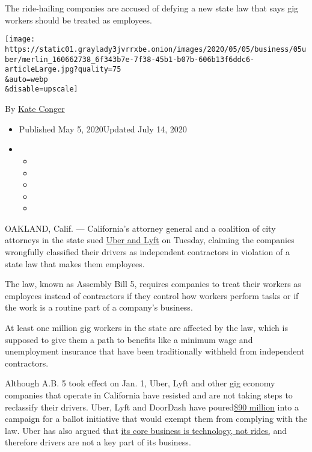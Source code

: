 The ride-hailing companies are accused of defying a new state law that
says gig workers should be treated as employees.

\texttt{[image: https://static01.graylady3jvrrxbe.onion/images/2020/05/05/business/05uber/merlin\_160662738\_6f343b7e-7f38-45b1-b07b-606b13f6ddc6-articleLarge.jpg?quality=75\\\&auto=webp\\\&disable=upscale]}

By \href{https://www.nytimes3xbfgragh.onion/by/kate-conger}{Kate Conger}

\begin{itemize}
\item
  Published May 5, 2020Updated July 14, 2020
\item
  \begin{itemize}
  \item
  \item
  \item
  \item
  \item
  \end{itemize}
\end{itemize}

OAKLAND, Calif. --- California's attorney general and a coalition of
city attorneys in the state sued
\href{https://www.nytimes3xbfgragh.onion/2020/08/20/technology/uber-lyft-california-shutdown.html}{Uber
and Lyft} on Tuesday, claiming the companies wrongfully classified their
drivers as independent contractors in violation of a state law that
makes them employees.

The law, known as Assembly Bill 5, requires companies to treat their
workers as employees instead of contractors if they control how workers
perform tasks or if the work is a routine part of a company's business.

At least one million gig workers in the state are affected by the law,
which is supposed to give them a path to benefits like a minimum wage
and unemployment insurance that have been traditionally withheld from
independent contractors.

Although A.B. 5 took effect on Jan. 1, Uber, Lyft and other gig economy
companies that operate in California have resisted and are not taking
steps to reclassify their drivers. Uber, Lyft and DoorDash have
poured\href{https://www.nytimes3xbfgragh.onion/2019/08/29/technology/uber-lyft-ballot-initiative.html}{\$90
million} into a campaign for a ballot initiative that would exempt them
from complying with the law. Uber has also argued that
\href{https://www.nytimes3xbfgragh.onion/2019/09/11/business/economy/uber-california-bill.html}{its
core business is technology, not rides,} and therefore drivers are not a
key part of its business.


